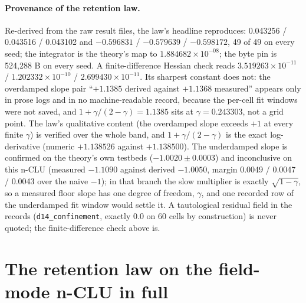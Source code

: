 \documentclass{article} %
\newcommand{\sci}[2]{\ensuremath{#1\times10^{#2}}}
\begin{document}
\paragraph{Provenance of the retention law.} Re-derived from the raw result files, the law's
headline reproduces: 0.043256 / 0.043516 / 0.043102 and $-0.596831$ / $-0.579639$ / $-0.598172$,
49 of 49 on every seed; the integrator is the theory's map to \sci{1.884682}{-08}; the byte pin is
524,288 B on every seed. A finite-difference Hessian check reads \sci{3.519263}{-11} /
\sci{1.202332}{-10} / \sci{2.699430}{-11}. %
Its sharpest constant does not: the overdamped slope pair ``$+1.1385$ derived against $+1.1368$
measured'' appears only in prose logs and in no machine-readable record, because the per-cell fit
windows were not saved, and $1+\gamma/(2-\gamma)=1.1385$ sits at $\gamma=0.243303$, not a grid
point. The law's qualitative content (the overdamped slope exceeds $+1$ at every finite $\gamma$)
is verified over the whole band, and $1+\gamma/(2-\gamma)$ is the exact log-derivative (numeric
$+1.138526$ against $+1.138500$). The underdamped slope is confirmed on the theory's own testbeds
($-1.0020\pm0.0003$) and inconclusive on this n-CLU (measured $-1.1090$ against derived $-1.0050$,
margin 0.0049 / 0.0047 / 0.0043 over the naive $-1$); in that branch the slow multiplier is exactly
$\sqrt{1-\gamma}$, so a measured floor slope has one degree of freedom, $\gamma$, and one recorded row
of the underdamped fit window would settle it. A tautological residual field in the records
(\texttt{d14\_confinement}, exactly 0.0 on 60 cells by construction) is never quoted; the
finite-difference check above is. %

\section{The retention law on the field-mode n-CLU in full}
\label{app:physics}
\end{document}
